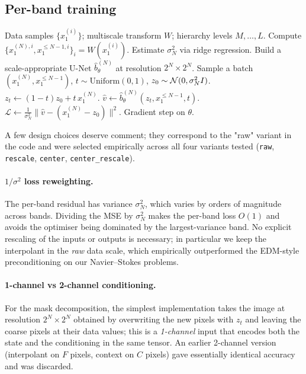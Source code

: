 \documentclass[11pt]{amsart}
\newcommand{\cL}{\mathcal{L}} \newcommand{\cF}{\mathcal{F}}
\theoremstyle{remark}
\numberwithin{equation}{section}
\begin{document}
\subsection{Per-band training}
\begin{algorithm}[t]
\caption{Per-band flow matching training (coarse-to-fine)}
\label{alg:training}
\begin{algorithmic}[1]
\REQUIRE Data samples $\{x_1^{(i)}\}$; multiscale transform $W$; hierarchy levels $M,\ldots,L$.
  \STATE Compute $\{x_1^{(N),i},x_1^{\le N-1,i}\}_i=W(x_1^{(i)})$.
  \STATE Estimate $\sigma_N^2$ via ridge regression.
  \STATE Build a scale-appropriate U-Net $\hat b^{(N)}_\theta$ at resolution $2^N\times 2^N$.
    \STATE Sample a batch $(x_1^{(N)},x_1^{\le N-1})$, $t\sim\mathrm{Uniform}(0,1)$, $z_0\sim\mathcal{N}(0,\sigma_N^2 I)$.
    \STATE $z_t\leftarrow (1-t)z_0 + t\,x_1^{(N)}$.\hfill{}
    \STATE $\hat v\leftarrow \hat b^{(N)}_\theta(z_t, x_1^{\le N-1}, t)$.
    \STATE $\cL\leftarrow \frac{1}{\sigma_N^2}\|\hat v-(x_1^{(N)}-z_0)\|^2$.\hfill{}
    \STATE Gradient step on $\theta$.
  \ENDWHILE
\ENDFOR
\end{algorithmic}
\end{algorithm}

A few design choices deserve comment; they correspond to the "raw" variant in the code and were selected empirically across all four variants tested (\texttt{raw}, \texttt{rescale}, \texttt{center}, \texttt{center\_rescale}).

\paragraph{$1/\sigma^2$ loss reweighting.} The per-band residual has variance $\sigma_N^2$, which varies by orders of magnitude across bands. Dividing the MSE by $\sigma_N^2$ makes the per-band loss $O(1)$ and avoids the optimiser being dominated by the largest-variance band. No explicit rescaling of the inputs or outputs is necessary; in particular we keep the interpolant in the \emph{raw} data scale, which empirically outperformed the EDM-style preconditioning \cite{karras2022elucidating} on our Navier--Stokes problems.

\paragraph{1-channel vs 2-channel conditioning.} For the mask decomposition, the simplest implementation takes the image at resolution $2^N\times 2^N$ obtained by overwriting the new pixels with $z_t$ and leaving the coarse pixels at their data values; this is a \emph{1-channel} input that encodes both the state and the conditioning in the same tensor. An earlier 2-channel version (interpolant on $F$ pixels, context on $C$ pixels) gave essentially identical accuracy and was discarded.
\end{document}

